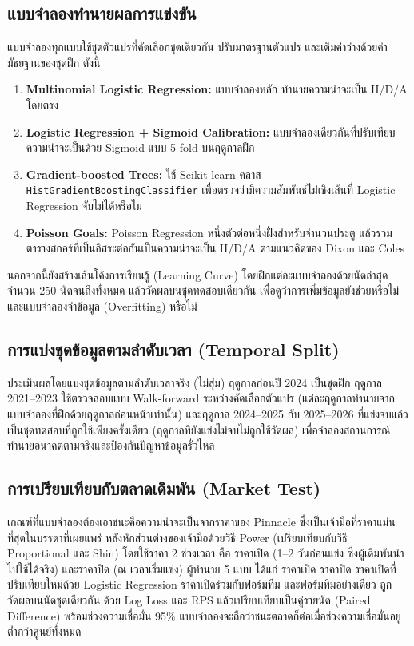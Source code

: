 \subsection{แบบจำลองทำนายผลการแข่งขัน}
แบบจำลองทุกแบบใช้ชุดตัวแปรที่คัดเลือกชุดเดียวกัน ปรับมาตรฐานตัวแปร และเติมค่าว่างด้วยค่ามัธยฐานของชุดฝึก ดังนี้
\begin{enumerate}[label=\arabic*)]
    \item \textbf{Multinomial Logistic Regression:} แบบจำลองหลัก ทำนายความน่าจะเป็น H/D/A โดยตรง
    \item \textbf{Logistic Regression + Sigmoid Calibration:} แบบจำลองเดียวกันที่ปรับเทียบความน่าจะเป็นด้วย Sigmoid แบบ 5-fold บนฤดูกาลฝึก
    \item \textbf{Gradient-boosted Trees:} ใช้ Scikit-learn \cite{scikit-learn} คลาส \texttt{HistGradientBoostingClassifier} เพื่อตรวจว่ามีความสัมพันธ์ไม่เชิงเส้นที่ Logistic Regression จับไม่ได้หรือไม่
    \item \textbf{Poisson Goals:} Poisson Regression หนึ่งตัวต่อหนึ่งฝั่งสำหรับจำนวนประตู แล้วรวมตารางสกอร์ที่เป็นอิสระต่อกันเป็นความน่าจะเป็น H/D/A ตามแนวคิดของ Dixon และ Coles \cite{dixon1997modelling}
\end{enumerate}
นอกจากนี้ยังสร้างเส้นโค้งการเรียนรู้ (Learning Curve) โดยฝึกแต่ละแบบจำลองด้วยนัดล่าสุดจำนวน 250 นัดจนถึงทั้งหมด แล้ววัดผลบนชุดทดสอบเดียวกัน เพื่อดูว่าการเพิ่มข้อมูลยังช่วยหรือไม่ และแบบจำลองจำข้อมูล (Overfitting) หรือไม่

\subsection{การแบ่งชุดข้อมูลตามลำดับเวลา (Temporal Split)}
ประเมินผลโดยแบ่งชุดข้อมูลตามลำดับเวลาจริง (ไม่สุ่ม) ฤดูกาลก่อนปี 2024 เป็นชุดฝึก ฤดูกาล 2021--2023 ใช้ตรวจสอบแบบ Walk-forward ระหว่างคัดเลือกตัวแปร (แต่ละฤดูกาลทำนายจากแบบจำลองที่ฝึกด้วยฤดูกาลก่อนหน้าเท่านั้น) และฤดูกาล 2024--2025 กับ 2025--2026 ที่แข่งจบแล้วเป็นชุดทดสอบที่ถูกใช้เพียงครั้งเดียว (ฤดูกาลที่ยังแข่งไม่จบไม่ถูกใช้วัดผล) เพื่อจำลองสถานการณ์ทำนายอนาคตตามจริงและป้องกันปัญหาข้อมูลรั่วไหล

\subsection{การเปรียบเทียบกับตลาดเดิมพัน (Market Test)}
เกณฑ์ที่แบบจำลองต้องเอาชนะคือความน่าจะเป็นจากราคาของ Pinnacle ซึ่งเป็นเจ้ามือที่ราคาแม่นที่สุดในบรรดาที่เผยแพร่ หลังหักส่วนต่างของเจ้ามือด้วยวิธี Power (เปรียบเทียบกับวิธี Proportional และ Shin) โดยใช้ราคา 2 ช่วงเวลา คือ ราคาเปิด (1--2 วันก่อนแข่ง ซึ่งผู้เดิมพันนำไปใช้ได้จริง) และราคาปิด (ณ เวลาเริ่มแข่ง) ผู้ทำนาย 5 แบบ ได้แก่ ราคาเปิด ราคาปิด ราคาเปิดที่ปรับเทียบใหม่ด้วย Logistic Regression ราคาเปิดร่วมกับฟอร์มทีม และฟอร์มทีมอย่างเดียว ถูกวัดผลบนนัดชุดเดียวกัน ด้วย Log Loss และ RPS แล้วเปรียบเทียบเป็นคู่รายนัด (Paired Difference) พร้อมช่วงความเชื่อมั่น 95\% แบบจำลองจะถือว่าชนะตลาดก็ต่อเมื่อช่วงความเชื่อมั่นอยู่ต่ำกว่าศูนย์ทั้งหมด

